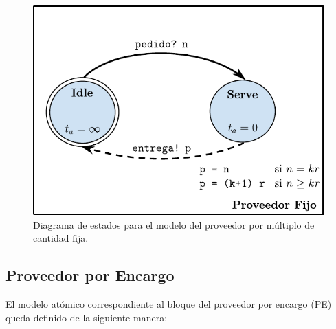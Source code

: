 \documentclass[10pt]{article}
\begin{document}
\begin{figure}[htbp]
	\centering
	\includegraphics{img/proveedorFijodevsgraph}
	\caption{Diagrama de estados para el modelo del proveedor por múltiplo de cantidad fija.}
	\label{fig:PF-estados}
\end{figure}

\subsection{Proveedor por Encargo\label{sec:PE}}
El modelo atómico correspondiente al bloque del proveedor por encargo (PE) queda definido de la siguiente manera:

\\
\end{document}
